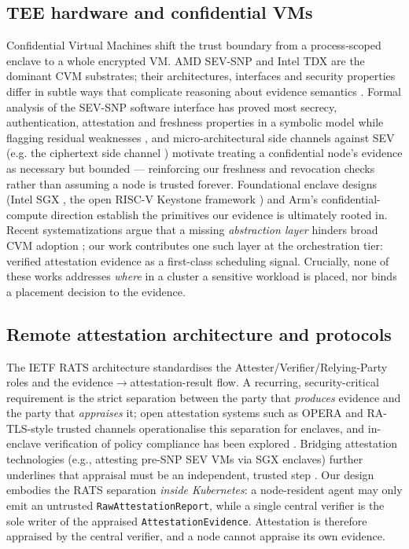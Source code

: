 \subsection{TEE hardware and confidential VMs}
Confidential Virtual Machines shift the trust boundary from a process-scoped
enclave to a whole encrypted VM. AMD SEV-SNP and Intel TDX are the dominant CVM
substrates; their architectures, interfaces and security properties differ in
subtle ways that complicate reasoning about evidence semantics
\cite{misono2024cvms,cheng2023tdx}. Formal analysis of the SEV-SNP software
interface has proved most secrecy, authentication, attestation and freshness
properties in a symbolic model while flagging residual weaknesses
\cite{paradzik2024sevsnp}, and micro-architectural side channels against SEV
(e.g. the ciphertext side channel \cite{li2021cipherleaks}) motivate treating a
confidential node's evidence as necessary but bounded --- reinforcing our
freshness and revocation checks rather than assuming a node is trusted forever. Foundational enclave designs (Intel SGX
\cite{costan2016sgx}, the open RISC-V Keystone framework \cite{lee2020keystone})
and Arm's confidential-compute direction \cite{xu2023virtcca,cerdeira2022rezone}
establish the primitives our evidence is ultimately rooted in. Recent
systematizations argue that a missing \emph{abstraction layer} hinders broad CVM
adoption \cite{michaud2025teesok}; our work contributes one such layer at the
orchestration tier: verified attestation evidence as a first-class scheduling
signal. Crucially, none of these works addresses \emph{where} in a cluster a
sensitive workload is placed, nor binds a placement decision to the evidence.

\subsection{Remote attestation architecture and protocols}
The IETF RATS architecture \cite{birkholz2023rats} standardises the
Attester/Verifier/Relying-Party roles and the evidence$\rightarrow$attestation-result
flow. A recurring, security-critical requirement is the strict separation between
the party that \emph{produces} evidence and the party that \emph{appraises} it;
open attestation systems such as OPERA \cite{chen2019opera} and RA-TLS-style
trusted channels \cite{knauth2018ratls,akama2024raweb} operationalise this
separation for enclaves, and in-enclave verification of policy compliance has
been explored \cite{liu2020confidattest}. Bridging attestation technologies
(e.g., attesting pre-SNP SEV VMs via SGX enclaves) further underlines that
appraisal must be an independent, trusted step \cite{antonino2023flexattest}.
Our design embodies the RATS separation \emph{inside Kubernetes}: a
node-resident agent may only emit an untrusted \texttt{RawAttestationReport},
while a single central verifier is the sole writer of the appraised
\texttt{AttestationEvidence}. Attestation is therefore appraised by the central
verifier, and a node cannot appraise its own evidence.

